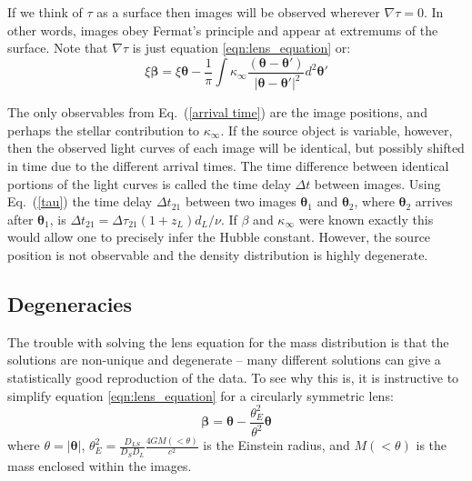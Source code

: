 \documentclass[galley]{mn2e}
\newcommand{\eqnref}[1] {Eq.~(\ref{#1})}
\renewcommand{\vec}[1]{\ensuremath{\boldsymbol{#1}}}
\begin{document}
If we think of $\tau$ as a surface then images will be observed wherever
$\nabla \tau = 0$. In other words, images obey Fermat's principle and appear at
extremums of the surface. Note that $\nabla \tau$ is just equation \ref{eqn:lens_equation} or:
\begin{equation}
  \xi \vec\beta = \xi \vec\theta - \frac 1\pi\int \kappa_\infty\frac{(\vec\theta - \vec\theta')}{\ |\vec\theta - \vec\theta'|^2}d^2\vec\theta'
\end{equation}

The only observables from \eqnref{arrival time} are the image positions, and
perhaps the stellar contribution to $\kappa_\infty$.  If the source object is
variable, however, then the observed light curves of each image will be
identical, but possibly shifted in time due to the different arrival times.
The time difference between identical portions of the light curves is called
the time delay $\Delta t$ between images.  Using \eqnref{tau} the time delay
$\Delta t_{21}$ between two images $\vec\theta_1$ and $\vec\theta_2$, where $\vec\theta_2$
arrives after $\vec\theta_1$, is $\Delta t_{21} = \Delta \tau_{21}(1+z_L)d_L /
\nu$. If $\beta$ and $\kappa_\infty$ were known exactly this would allow one
to precisely infer the Hubble constant. However, the source position is not
observable and the density distribution is highly degenerate.

\subsection{Degeneracies}\label{sec:degen} %

The trouble with solving the lens equation for the mass distribution is that the solutions are non-unique and degenerate -- many different solutions can give a statistically good reproduction of the data. To see why this is, it is instructive to simplify equation \ref{eqn:lens_equation} for a circularly symmetric lens: 
%
\begin{equation}
\vec\beta = \vec\theta - \frac{\theta_E^2}{\theta^2}\vec\theta
\label{eqn:lens_equation_circ}
\end{equation}
%
where $\theta = |\vec\theta|$, $\theta_E^2 = \frac{D_{LS}}{D_S D_L} \frac{4 GM(<\theta)}{c^2}$ is the Einstein radius, and $M(<\theta)$ is the mass enclosed within the images. 
\end{document}

